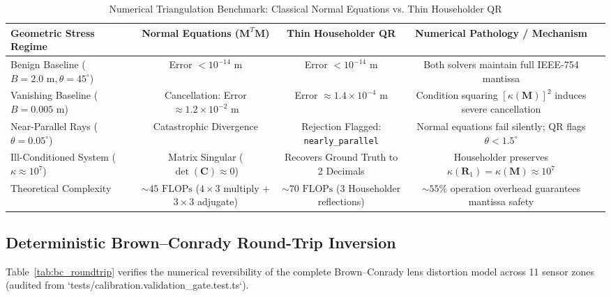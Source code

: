 \documentclass[journal]{IEEEtran}
\begin{document}
\begin{table}[!t]
\caption{Numerical Triangulation Benchmark: Classical Normal Equations vs. Thin Householder QR}
\label{tab:qr_vs_normal}
\centering
\begin{tabular}{lcccc}\toprule
\textbf{Geometric Stress Regime} & \textbf{Normal Equations ($\mathbf{M}^T\mathbf{M}$)} & \textbf{Thin Householder QR} & \textbf{Numerical Pathology / Mechanism} \\\midrule
Benign Baseline ($B = 2.0\text{ m}, \theta = 45^\circ$) & Error $< 10^{-14}\text{ m}$ & Error $< 10^{-14}\text{ m}$ & Both solvers maintain full IEEE-754 mantissa \\
Vanishing Baseline ($B = 0.005\text{ m}$) & Cancellation: Error $\approx 1.2 \times 10^{-2}\text{ m}$ & Error $\approx 1.4 \times 10^{-4}\text{ m}$ & Condition squaring $[\kappa(\mathbf{M})]^2$ induces severe cancellation \\
Near-Parallel Rays ($\theta = 0.05^\circ$) & Catastrophic Divergence & Rejection Flagged: \texttt{nearly\_parallel} & Normal equations fail silently; QR flags $\theta < 1.5^\circ$ \\
Ill-Conditioned System ($\kappa \approx 10^7$) & Matrix Singular ($\det(\mathbf{C}) \approx 0$) & Recovers Ground Truth to 2 Decimals & Householder preserves $\kappa(\mathbf{R}_1) = \kappa(\mathbf{M}) \approx 10^7$ \\
Theoretical Complexity & $\sim 45\text{ FLOPs}$ ($4 \times 3$ multiply + $3 \times 3$ adjugate) & $\sim 70\text{ FLOPs}$ (3 Householder reflections) & $\sim 55\%$ operation overhead guarantees mantissa safety \\\bottomrule
\end{tabular}
\end{table}

\subsection{Deterministic Brown--Conrady Round-Trip Inversion}
Table~\ref{tab:bc_roundtrip} verifies the numerical reversibility of the complete Brown--Conrady lens distortion model across 11 sensor zones (audited from `tests/calibration.validation_gate.test.ts`).
\end{document}
